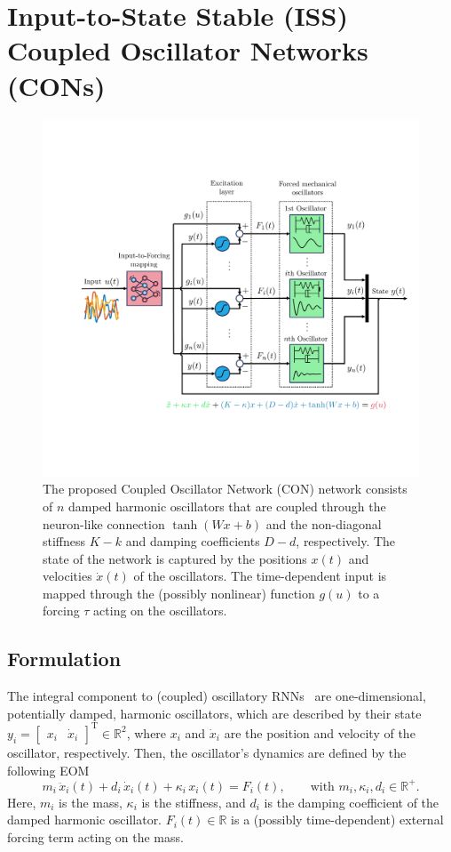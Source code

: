 \section{Input-to-State Stable (ISS) Coupled Oscillator Networks (CONs)}\label{sec:con:con}

\begin{figure}[t]
    \centering
    \includegraphics[width=0.8\linewidth]{con/figures/con/blockdiagram_coupled_oscillator_network_v2_cropped.pdf}
    \caption{The proposed Coupled Oscillator Network (CON) network consists of $n$ damped harmonic oscillators that are coupled through the neuron-like connection $\tanh(Wx+b)$ and the non-diagonal stiffness $K-k$ and damping coefficients $D-d$, respectively. The state of the network is captured by the positions $x(t)$ and velocities $\dot{x}(t)$ of the oscillators. The time-dependent input is mapped through the (possibly nonlinear) function $g(u)$ to a forcing $\tau$ acting on the oscillators.}
    \label{fig:con:con}
\end{figure}

\subsection{Formulation} 
The integral component to (coupled) oscillatory \glspl{RNN}~\cite{rusch2020coupled, rusch2021unicornn, ceni2024random, lanthaler2024neural} are one-dimensional, potentially damped, harmonic oscillators, which are described by their state $y_i = \begin{bmatrix}
    x_i & \dot{x}_i
\end{bmatrix}^\mathrm{T} \in \mathbb{R}^2$, where $x_i$ and $\dot{x}_i$ are the position and velocity of the oscillator, respectively. Then, the oscillator's dynamics are defined by the following \gls{EOM}
\begin{equation}\label{eq:con:harmonic_oscillator}
    m_i \, \ddot{x}_i(t) + d_i \, \dot{x}_i(t) + \kappa_i \, x_i(t) = F_i(t),
    \qquad
    \text{with } m_i, \kappa_i, d_i \in \mathbb{R}^+.
\end{equation}
Here, $m_i$ is the mass, $\kappa_i$ is the stiffness, and $d_i$ is the damping coefficient of the damped harmonic oscillator. $F_i(t) \in \mathbb{R}$ is a (possibly time-dependent) external forcing term acting on the mass.

